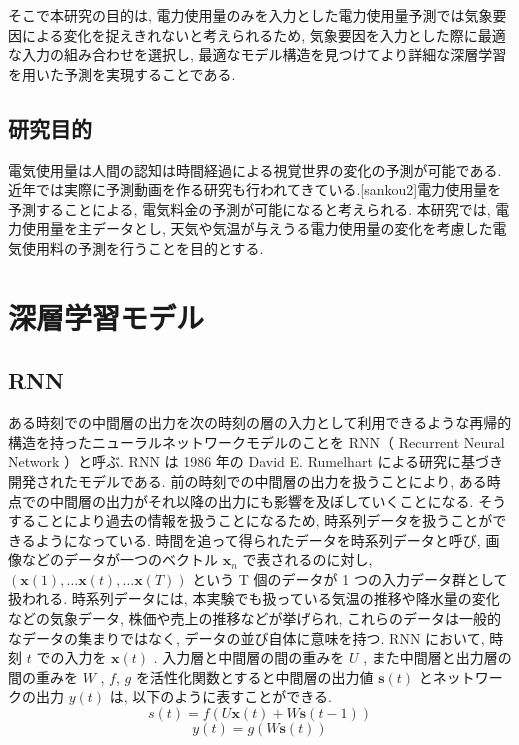 そこで本研究の目的は, 電力使用量のみを入力とした電力使用量予測では気象要因による変化を捉えきれないと考えられるため, 気象要因を入力とした際に最適な入力の組み合わせを選択し, 最適なモデル構造を見つけてより詳細な深層学習を用いた予測を実現することである.

\subsection{研究目的}

電気使用量は人間の認知は時間経過による視覚世界の変化の予測が可能である. 近年では実際に予測動画を作る研究も行われてきている.[sankou2]電力使用量を予測することによる, 電気料金の予測が可能になると考えられる. 本研究では, 電力使用量を主データとし, 天気や気温が与えうる電力使用量の変化を考慮した電気使用料の予測を行うことを目的とする. 

\section{深層学習モデル}
\subsection{RNN}
ある時刻での中間層の出力を次の時刻の層の入力として利用できるような再帰的構造を持ったニューラルネットワークモデルのことを RNN（ Recurrent Neural Network ）と呼ぶ. RNN は 1986 年の David E. Rumelhart による研究に基づき開発されたモデルである\cite{sankou6}. 
前の時刻での中間層の出力を扱うことにより, ある時点での中間層の出力がそれ以降の出力にも影響を及ぼしていくことになる.
そうすることにより過去の情報を扱うことになるため, 
時系列データを扱うことができるようになっている. 
時間を追って得られたデータを時系列データと呼び,
画像などのデータが一つのベクトル $\bm{x}_n$ で表されるのに対し,
$(\bm{x}(1),… \bm{x}(t),… \bm{x}(T))$ という T 個のデータが 1 つの入力データ群として扱われる.
時系列データには,
本実験でも扱っている気温の推移や降水量の変化などの気象データ,
株価や売上の推移などが挙げられ,
これらのデータは一般的なデータの集まりではなく,
データの並び自体に意味を持つ. 
RNN において, 
時刻 $t$ での入力を $\bm{x}(t)$ .
入力層と中間層の間の重みを $U$ ,
また中間層と出力層の間の重みを $W$ ,
$f$, $g$ を活性化関数とすると中間層の出力値 $\bm{s}(t)$ とネットワークの出力 $y(t)$ は,
以下のように表すことができる.
\begin{equation}
  s(t) = f(U\bm{x}(t) + W\bm{s}(t-1))
  \label{eq:RNN1}
\end{equation}
\begin{equation}
  y(t) = g(W\bm{s}(t))
  \label{eq:RNN2}
\end{equation}

